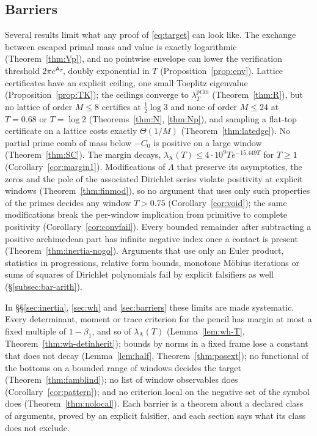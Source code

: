 \documentclass[11pt]{amsart}
\theoremstyle{definition}
\theoremstyle{remark}
\newcommand{\lamP}{\lambda^{\mathrm{prim}}_T}
\newcommand{\lamA}{\lambda_{\mathrm A}(T)}
\newcommand{\Aconst}{\mathsf A_T}
\begin{document}
\subsection{Barriers}
Several results limit what any proof of \eqref{eq:target} can look like. The exchange between escaped
primal mass and value is exactly logarithmic (Theorem~\ref{thm:Vp}), and no pointwise envelope can lower
the verification threshold $2\pi e^{\Aconst}$, doubly exponential in $T$ (Proposition~\ref{prop:env}).
Lattice certificates have an explicit ceiling, one small Toeplitz eigenvalue (Proposition~\ref{prop:TK});
the ceilings converge to $\lamP$ (Theorem~\ref{thm:R}), but no lattice of order $M\le8$ certifies at
$\frac12\log3$ and none of order $M\le24$ at $T=0.68$ or $T=\log2$ (Theorems~\ref{thm:N}, \ref{thm:Np}),
and sampling a flat-top certificate on a lattice costs exactly $\Theta(1/M)$
(Theorem~\ref{thm:latedge}). No partial prime comb of mass below $-C_0$ is positive on a large window
(Theorem~\ref{thm:SC}). The margin decays, $\lamA\le4\cdot10^9Te^{-15.449T}$ for $T\ge1$
(Corollary~\ref{cor:margin1}). Modifications of $\Lambda$ that preserve its asymptotics, the zeros and the
pole of the associated Dirichlet series violate positivity at explicit windows (Theorem~\ref{thm:finmod}), so
no argument that uses only such properties of the primes decides any window $T>0.75$
(Corollary~\ref{cor:void}); the same modifications break the per-window implication from primitive to
complete positivity (Corollary~\ref{cor:convfail}). Every bounded remainder after subtracting a positive
archimedean part has infinite negative index once a contact is present (Theorem~\ref{thm:inertia-nogo}).
Arguments that use only an Euler product, statistics in progressions, relative form bounds, monotone M\"obius iterations or
sums of squares of Dirichlet polynomials fail by explicit falsifiers as well (\S\ref{subsec:bar-arith}).

In \S\S\ref{sec:inertia}, \ref{sec:wh} and \ref{sec:barriers} these limits are made systematic.  Every
determinant, moment or trace criterion for the pencil has margin at most a fixed multiple of $1-\beta_1$, and
so of $\lamA$ (Lemma~\ref{lem:wh-T}, Theorem~\ref{thm:wh-detinherit}); bounds by norms in a fixed frame lose a
constant that does not decay (Lemma~\ref{lem:half}, Theorem~\ref{thm:posext}); no functional of the bottoms on a
bounded range of windows decides the target (Theorem~\ref{thm:famblind}); no list of window observables does
(Corollary~\ref{cor:pattern}); and no criterion local on the negative set of the symbol does
(Theorem~\ref{thm:nolocal}). Each barrier is a theorem about a declared class of arguments, proved by an explicit
falsifier, and each section says what its class does not exclude.
\end{document}
